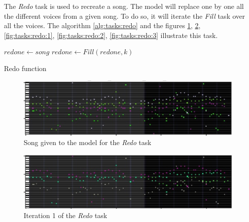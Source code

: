 \documentclass[12pt]{report}
\begin{document}
The \textit{Redo} task is used to recreate a song.
The model will replace one by one all the different voices from a given song.
To do so, it will iterate the \textit{Fill} task over all the voices.
The algorithm \ref{alg:tasks:redo} and the figures \ref{fig:tasks:redo:truth}, \ref{fig:tasks:redo:0}, \ref{fig:tasks:redo:1}, \ref{fig:tasks:redo:2}, \ref{fig:tasks:redo:3} illustrate this task.

\begin{algorithm}
    \begin{algorithmic}[1]
        \Statex
            \State $redone \gets song$
                \State $redone \gets Fill(redone, k)$
            \EndFor
            \State {}
        \EndFunction
        \end{algorithmic}
    \caption{Redo function}
    \label{alg:tasks:redo}
\end{algorithm}


\begin{figure}[htbp]
    \centering
    \includegraphics[width=\textwidth]{images/generated_midis/tasks/redo/task-redo-truth.jpg}
    \caption{Song given to the model for the \textit{Redo} task}
    \label{fig:tasks:redo:truth}
\end{figure}

\begin{figure}[htbp]
    \centering
    \includegraphics[width=\textwidth]{images/generated_midis/tasks/redo/task-redo-0.jpg}
    \caption{Iteration 1 of the \textit{Redo} task}
    \label{fig:tasks:redo:0}
\end{figure}
\end{document}
